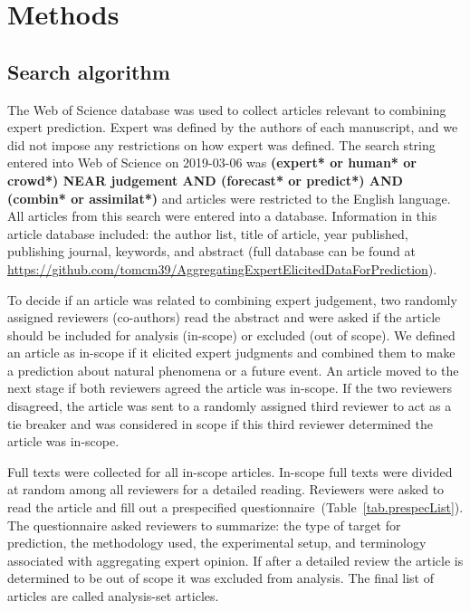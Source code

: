 \documentclass[preprint,authoryear]{elsarticle}
\begin{document}
\section{Methods}
\label{sec.methods}

\subsection{Search algorithm}

The Web of Science database was used to collect articles relevant to combining expert prediction.
Expert was defined by the authors of each manuscript, and we did not impose any restrictions on how expert was defined.
The search string entered into Web of Science on 2019-03-06 was \textbf{(expert* or human* or crowd*) NEAR judgement AND (forecast* or predict*) AND (combin* or assimilat*)} and articles were restricted to the English language.
All articles from this search were entered into a database.
Information in this article database included: the author list, title of article, year published, publishing journal, keywords, and abstract (full database can be found at \url{https://github.com/tomcm39/AggregatingExpertElicitedDataForPrediction}).

To decide if an article was related to combining expert judgement, two randomly assigned reviewers (co-authors) read the abstract and were asked if the article should be included for analysis (in-scope) or excluded (out of scope).
We defined an article as in-scope if it elicited expert judgments and combined them to make a prediction about natural phenomena or a future event.
An article moved to the next stage if both reviewers agreed the article was in-scope.
If the two reviewers disagreed, the article was sent to a randomly assigned third reviewer to act as a tie breaker and was considered in scope if this third reviewer determined the article was in-scope.

Full texts were collected for all in-scope articles.
In-scope full texts were divided at random among all reviewers for a detailed reading.
Reviewers were asked to read the article and fill out a prespecified questionnaire~(Table~\ref{tab.prespecList}).
The questionnaire asked reviewers to summarize: the type of target for prediction, the methodology used, the experimental setup, and terminology associated with aggregating expert opinion.
If after a detailed review the article is determined to be out of scope it was excluded from analysis.
The final list of articles are called analysis-set articles.
\end{document}
